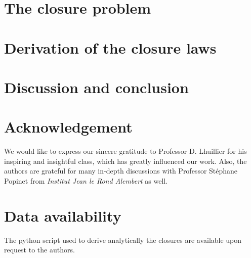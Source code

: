 \documentclass[11pt]{My_preprint}
\begin{document}
\section{The closure problem}
\label{ap:Closure_problem}


\section{Derivation of the closure laws}
\label{sec:application}


\section{Discussion and conclusion}



\section*{Acknowledgement}
We would like to express our sincere gratitude to Professor D. Lhuillier for his inspiring and insightful class, which has greatly influenced our work.
Also, the authors are grateful for many in-depth discussions with Professor St\'ephane Popinet from \textit{Institut Jean le Rond Alembert} as well. 

\section*{Data availability}

The python script used to derive analytically the closures are available upon request to the authors. 


\appendix

%
%
% 

%


\end{document}

